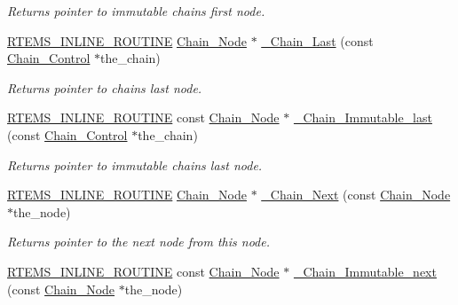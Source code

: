 \begin{DoxyCompactItemize}
\begin{DoxyCompactList}\small\item\em Returns pointer to immutable chain\textquotesingle{}s first node. \end{DoxyCompactList}\item 
\mbox{\hyperlink{group__RTEMSScoreBaseDefs_gac216239df231d5dbd15e3520b0b9313f}{R\+T\+E\+M\+S\+\_\+\+I\+N\+L\+I\+N\+E\+\_\+\+R\+O\+U\+T\+I\+NE}} \mbox{\hyperlink{group__RTEMSScoreChain_ga0dd4bfcca1ac7f90de2842e447846d3d}{Chain\+\_\+\+Node}} $\ast$ \mbox{\hyperlink{group__RTEMSScoreChain_gaf31036dacdeac30f4890d3b21fe7cad7}{\+\_\+\+Chain\+\_\+\+Last}} (const \mbox{\hyperlink{unionChain__Control}{Chain\+\_\+\+Control}} $\ast$the\+\_\+chain)
\begin{DoxyCompactList}\small\item\em Returns pointer to chain\textquotesingle{}s last node. \end{DoxyCompactList}\item 
\mbox{\hyperlink{group__RTEMSScoreBaseDefs_gac216239df231d5dbd15e3520b0b9313f}{R\+T\+E\+M\+S\+\_\+\+I\+N\+L\+I\+N\+E\+\_\+\+R\+O\+U\+T\+I\+NE}} const \mbox{\hyperlink{group__RTEMSScoreChain_ga0dd4bfcca1ac7f90de2842e447846d3d}{Chain\+\_\+\+Node}} $\ast$ \mbox{\hyperlink{group__RTEMSScoreChain_gae66d9e6f15f8bf60da087c079c0dfcad}{\+\_\+\+Chain\+\_\+\+Immutable\+\_\+last}} (const \mbox{\hyperlink{unionChain__Control}{Chain\+\_\+\+Control}} $\ast$the\+\_\+chain)
\begin{DoxyCompactList}\small\item\em Returns pointer to immutable chain\textquotesingle{}s last node. \end{DoxyCompactList}\item 
\mbox{\hyperlink{group__RTEMSScoreBaseDefs_gac216239df231d5dbd15e3520b0b9313f}{R\+T\+E\+M\+S\+\_\+\+I\+N\+L\+I\+N\+E\+\_\+\+R\+O\+U\+T\+I\+NE}} \mbox{\hyperlink{group__RTEMSScoreChain_ga0dd4bfcca1ac7f90de2842e447846d3d}{Chain\+\_\+\+Node}} $\ast$ \mbox{\hyperlink{group__RTEMSScoreChain_ga9502cc5cb6c81ef2bce33698005e1752}{\+\_\+\+Chain\+\_\+\+Next}} (const \mbox{\hyperlink{group__RTEMSScoreChain_ga0dd4bfcca1ac7f90de2842e447846d3d}{Chain\+\_\+\+Node}} $\ast$the\+\_\+node)
\begin{DoxyCompactList}\small\item\em Returns pointer to the next node from this node. \end{DoxyCompactList}\item 
\mbox{\hyperlink{group__RTEMSScoreBaseDefs_gac216239df231d5dbd15e3520b0b9313f}{R\+T\+E\+M\+S\+\_\+\+I\+N\+L\+I\+N\+E\+\_\+\+R\+O\+U\+T\+I\+NE}} const \mbox{\hyperlink{group__RTEMSScoreChain_ga0dd4bfcca1ac7f90de2842e447846d3d}{Chain\+\_\+\+Node}} $\ast$ \mbox{\hyperlink{group__RTEMSScoreChain_gaf1838bc5651d4d6de6bc380c40a8300e}{\+\_\+\+Chain\+\_\+\+Immutable\+\_\+next}} (const \mbox{\hyperlink{group__RTEMSScoreChain_ga0dd4bfcca1ac7f90de2842e447846d3d}{Chain\+\_\+\+Node}} $\ast$the\+\_\+node)

\end{DoxyCompactItemize}

